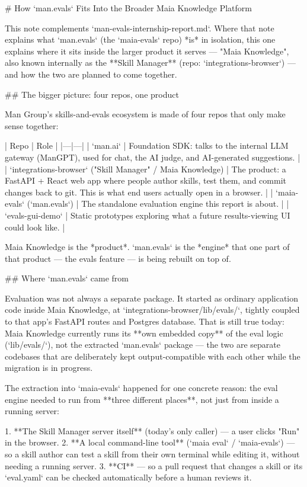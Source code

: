 # How `man.evals` Fits Into the Broader Maia Knowledge Platform

This note complements `man-evals-internship-report.md`.
Where that note explains what `man.evals` (the `maia-evals` repo) *is* in isolation, this one explains where it sits inside the larger product it serves — "Maia Knowledge", also known internally as the **Skill Manager** (repo: `integrations-browser`) — and how the two are planned to come together.

## The bigger picture: four repos, one product

Man Group's skills-and-evals ecosystem is made of four repos that only make sense together:

| Repo | Role |
|---|---|
| `man.ai` | Foundation SDK: talks to the internal LLM gateway (ManGPT), used for chat, the AI judge, and AI-generated suggestions. |
| `integrations-browser` ("Skill Manager" / Maia Knowledge) | The product: a FastAPI + React web app where people author skills, test them, and commit changes back to git. This is what end users actually open in a browser. |
| `maia-evals` (`man.evals`) | The standalone evaluation engine this report is about. |
| `evals-gui-demo` | Static prototypes exploring what a future results-viewing UI could look like. |

Maia Knowledge is the *product*.
`man.evals` is the *engine* that one part of that product — the evals feature — is being rebuilt on top of.

## Where `man.evals` came from

Evaluation was not always a separate package.
It started as ordinary application code inside Maia Knowledge, at `integrations-browser/lib/evals/`, tightly coupled to that app's FastAPI routes and Postgres database.
That is still true today: Maia Knowledge currently runs its **own embedded copy** of the eval logic (`lib/evals/`), not the extracted `man.evals` package — the two are separate codebases that are deliberately kept output-compatible with each other while the migration is in progress.

The extraction into `maia-evals` happened for one concrete reason: the eval engine needed to run from **three different places**, not just from inside a running server:

1. **The Skill Manager server itself** (today's only caller) — a user clicks "Run" in the browser.
2. **A local command-line tool** (`maia eval` / `maia-evals`) — so a skill author can test a skill from their own terminal while editing it, without needing a running server.
3. **CI** — so a pull request that changes a skill or its `eval.yaml` can be checked automatically before a human reviews it.

